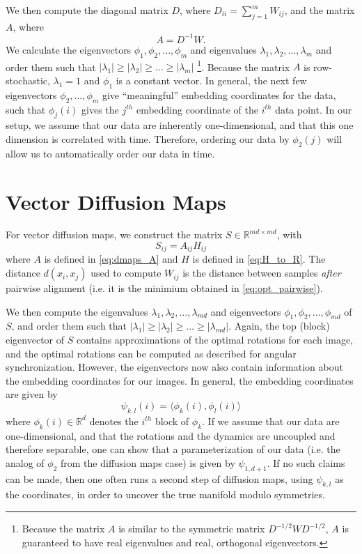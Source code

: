 \documentclass{pnastwo}
\begin{document}
\begin{article}
\begin{materials}
We then compute the diagonal matrix $D$, where $D_{ii} = \sum_{j=1}^{m} W_{ij}$, and the matrix $A$, where
\begin{equation} \label{eq:dmaps_A}
A = D^{-1} W.
\end{equation} 
%
We calculate the eigenvectors $\phi_1, \phi_2, \dots, \phi_m$ and eigenvalues $\lambda_1, \lambda_2, \dots, \lambda_m$ and order them such that $|\lambda_1| \ge |\lambda_2| \ge \dots \ge |\lambda_m|$ \footnote{Because the matrix $A$ is similar to the symmetric matrix $D^{-1/2} W D^{-1/2}$, $A$ is guaranteed to have real eigenvalues and real, orthogonal eigenvectors.}. 
%
Because the matrix $A$ is row-stochastic, $\lambda_1=1$ and $\phi_1$ is a constant vector.
%
In general, the next few eigenvectors $\phi_2, \dots, \phi_m$ give ``meaningful'' embedding coordinates for the data, such that $\phi_j(i)$ gives the $j^{th}$ embedding coordinate of the $i^{th}$ data point. 
%
In our setup, we assume that our data are inherently one-dimensional, and that this one dimension is correlated with time.
%
Therefore, ordering our data by $\phi_2(j)$ will allow us to automatically order our data in time.

\section{Vector Diffusion Maps}

For vector diffusion maps, we construct the matrix $S \in \mathbb{R}^{md \times md}$, with
\begin{equation}
	S_{ij} = A_{ij} H_{ij}
\end{equation}
%
where $A$ is defined in \eqref{eq:dmaps_A} and $H$ is defined in \eqref{eq:H_to_R}.
%
The distance $d(x_i, x_j)$ used to compute $W_{ij}$ is the distance between samples {\em after} pairwise alignment (i.e. it is the minimium obtained in \eqref{eq:opt_pairwise}). 

We then compute the eigenvalues $\lambda_1, \lambda_2, \dots, \lambda_{md}$ and eigenvectors $\phi_1, \phi_2, \dots, \phi_{md}$ of $S$, and order them such that $|\lambda_1| \ge |\lambda_2| \ge \dots \ge |\lambda_{md}|$.
%
Again, the top (block) eigenvector of $S$ contains approximations of the optimal rotations for each image, and the optimal rotations can be computed as described for angular synchronization.
%
However, the eigenvectors now also contain information about the embedding coordinates for our images.
%
In general, the embedding coordinates are given by 
\begin{equation}
\psi_{k,l} (i) = \langle \phi_k(i), \phi_l(i) \rangle
\end{equation}
where $\phi_k(i) \in \mathbb{R}^d$ denotes the $i^{th}$ block of $\phi_k$.
%
If we assume that our data are one-dimensional, and that the rotations and the dynamics are uncoupled and therefore separable, one can show that a parameterization of our data (i.e. the analog of $\phi_2$ from the diffusion maps case) is given by $\psi_{1,d+1}$.
%
If no such claims can be made, then one often runs a second step of diffusion maps, using $\psi_{k,l}$ as the coordinates, in order to uncover the true manifold modulo symmetries. 


\end{materials}
\end{article}
\end{document}
